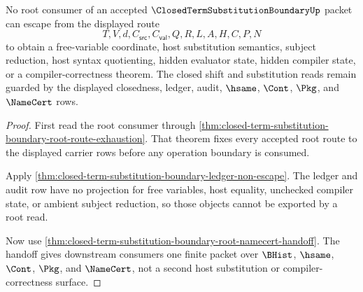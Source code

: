 \begin{theorem}
\label{thm:closed-term-substitution-boundary-root-nonescape}
No root consumer of an accepted $\ClosedTermSubstitutionBoundaryUp$ packet can escape from the displayed route
$$
T,V,d,C_{\mathsf{src}},C_{\mathsf{val}},Q,R,L,A,H,C,P,N
$$
to obtain a free-variable coordinate, host substitution semantics, subject reduction, host syntax quotienting, hidden evaluator state, hidden compiler state, or a compiler-correctness theorem. The closed shift and substitution reads remain guarded by the displayed closedness, ledger, audit, $\hsame$, $\Cont$, $\Pkg$, and $\NameCert$ rows.
\end{theorem}
\begin{proof}
First read the root consumer through \autoref{thm:closed-term-substitution-boundary-root-route-exhaustion}. That theorem fixes every accepted root route to the displayed carrier rows before any operation boundary is consumed.

Apply \autoref{thm:closed-term-substitution-boundary-ledger-non-escape}. The ledger and audit row have no projection for free variables, host equality, unchecked compiler state, or ambient subject reduction, so those objects cannot be exported by a root read.

Now use \autoref{thm:closed-term-substitution-boundary-root-namecert-handoff}. The handoff gives downstream consumers one finite packet over $\BHist$, $\hsame$, $\Cont$, $\Pkg$, and $\NameCert$, not a second host substitution or compiler-correctness surface.
\end{proof}

